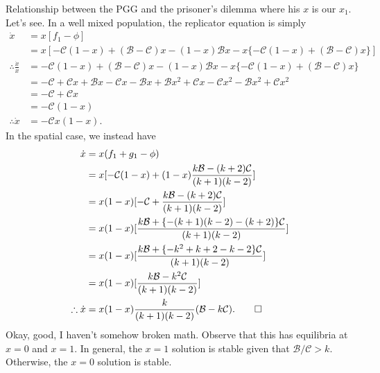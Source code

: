 \documentclass[13pt]{amsart}
\newcommand{\B}{\mathcal{B}}
\newcommand{\C}{\mathcal{C}}
\begin{document}
\begin{section}{Relationship between the PGG and the prisoner's dilemma}
where his $x$ is our $x_1$.
Let's see.
In a well mixed population, the replicator equation is simply
\begin{equation}
    \begin{split}
        \dot{x} & = x[f_1 - \phi]
        \\
        & = x[-\C (1-x) + (\B - \C)x - (1-x) \B x - x\{ -\C(1-x) + (\B - \C) x \} ]
        \\
        \therefore \frac{\dot{x}}{x} & = -\C (1-x) + (\B - \C)x - (1-x) \B x - x\{ -\C(1-x) + (\B - \C) x \}
        \\
        & = -\C + \C x + \B x - \C x - \B x + \B x^2 + \C x - \C x^2 - \B x^2 + \C x^2
        \\
        & = -\C + \C x
        \\
        & = -\C (1 - x)
        \\
        \therefore \dot{x} & = -\C x (1-x).
    \end{split}
\end{equation}
In the spatial case, we instead have
\begin{equation}
    \begin{split}
        \dot{x} & = x(f_1 + g_1 - \phi)
        \\
        & = x[-\C (1 - x) + (1-x)\frac{k \B - (k+2) \C}{(k+1)(k-2)}]
        \\
        & = x(1-x)[-\C + \frac{k \B - (k+2) \C}{(k+1)(k-2)}]
        \\
        & = x(1-x)[\frac{k \B + \{-(k+1)(k-2) - (k+2)\}\C}{(k+1)(k-2)}]
        \\
        & = x(1-x)[\frac{k \B + \{-k^2 + k + 2 - k - 2\}\C}{(k+1)(k-2)}]
        \\
        & = x(1-x)[\frac{k \B - k^2\C}{(k+1)(k-2)}]
        \\
        \therefore \dot{x} & = x(1-x) \frac{k}{(k+1)(k-2)}(\B - k\C). \qed
    \end{split}
\end{equation}
Okay, good, I haven't somehow broken math.
Observe that this has equilibria at $x = 0$ and $x = 1$.
In general, the $x = 1$ solution is stable given that $\B/\C > k$.
Otherwise, the $x = 0$ solution is stable.


\end{section}
\end{document}
